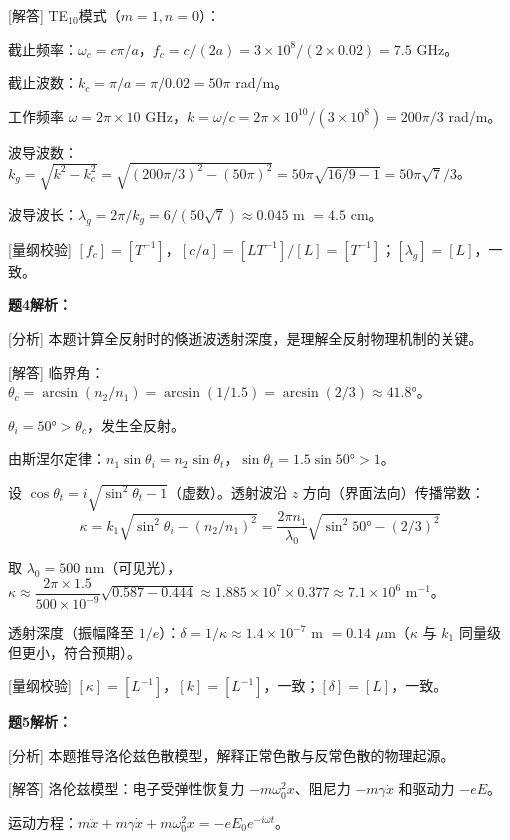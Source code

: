 \documentclass[11pt,a4paper,openany,oneside]{book}
\begin{document}
[解答] TE$_{10}$模式（$m=1, n=0$）：

截止频率：$\omega_c = c\pi/a$，$f_c = c/(2a) = 3\times 10^8/(2\times 0.02) = 7.5$ GHz。

截止波数：$k_c = \pi/a = \pi/0.02 = 50\pi$ rad/m。

工作频率 $\omega = 2\pi\times 10$ GHz，$k = \omega/c = 2\pi\times 10^{10}/(3\times 10^8) = 200\pi/3$ rad/m。

波导波数：$k_g = \sqrt{k^2 - k_c^2} = \sqrt{(200\pi/3)^2 - (50\pi)^2} = 50\pi\sqrt{16/9 - 1} = 50\pi\sqrt{7}/3$。

波导波长：$\lambda_g = 2\pi/k_g = 6/(50\sqrt{7}) \approx 0.045$ m $= 4.5$ cm。\qedsymbol

[量纲校验] $[f_c] = [T^{-1}]$，$[c/a] = [LT^{-1}]/[L] = [T^{-1}]$；$[\lambda_g] = [L]$，一致。\qedsymbol

\textbf{题4解析：}

[分析] 本题计算全反射时的倏逝波透射深度，是理解全反射物理机制的关键。

[解答] 临界角：$\theta_c = \arcsin(n_2/n_1) = \arcsin(1/1.5) = \arcsin(2/3) \approx 41.8°$。

$\theta_i = 50° > \theta_c$，发生全反射。

由斯涅尔定律：$n_1\sin\theta_i = n_2\sin\theta_t$，$\sin\theta_t = 1.5\sin 50° > 1$。

设 $\cos\theta_t = i\sqrt{\sin^2\theta_t - 1}$（虚数）。透射波沿 $z$ 方向（界面法向）传播常数：
\[
\kappa = k_1\sqrt{\sin^2\theta_i - (n_2/n_1)^2} = \frac{2\pi n_1}{\lambda_0}\sqrt{\sin^2 50° - (2/3)^2}
\]

取 $\lambda_0 = 500$ nm（可见光），$\kappa \approx \dfrac{2\pi\times 1.5}{500\times 10^{-9}}\sqrt{0.587 - 0.444} \approx 1.885\times 10^{7}\times 0.377 \approx 7.1\times 10^{6}$ m$^{-1}$。

透射深度（振幅降至 $1/e$）：$\delta = 1/\kappa \approx 1.4\times 10^{-7}$ m $= 0.14$ $\mu$m（$\kappa$ 与 $k_1$ 同量级但更小，符合预期）。\qedsymbol

[量纲校验] $[\kappa] = [L^{-1}]$，$[k] = [L^{-1}]$，一致；$[\delta] = [L]$，一致。\qedsymbol

\textbf{题5解析：}

[分析] 本题推导洛伦兹色散模型，解释正常色散与反常色散的物理起源。

[解答] 洛伦兹模型：电子受弹性恢复力 $-m\omega_0^2 x$、阻尼力 $-m\gamma\dot{x}$ 和驱动力 $-eE$。

运动方程：$m\ddot{x} + m\gamma\dot{x} + m\omega_0^2 x = -eE_0 e^{-i\omega t}$。
\end{document}
